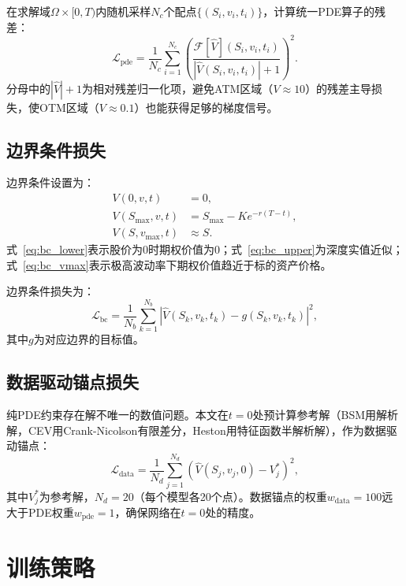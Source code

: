 在求解域$\Omega\times[0,T)$内随机采样$N_c$个配点$\{(S_i,v_i,t_i)\}$，计算统一PDE算子的残差：
\begin{equation}
  \mathcal{L}_\text{pde} = \frac{1}{N_c}\sum_{i=1}^{N_c}
    \left(\frac{\mathcal{F}[\hat{V}](S_i,v_i,t_i)}{|\hat{V}(S_i,v_i,t_i)|+1}\right)^2.
\end{equation}
分母中的$|\hat{V}|+1$为相对残差归一化项，避免ATM区域（$V\approx 10$）的残差主导损失，使OTM区域（$V\approx 0.1$）也能获得足够的梯度信号。

\subsection{边界条件损失}

边界条件设置为：
\begin{align}
  V(0,v,t) &= 0, \label{eq:bc_lower} \\
  V(S_\text{max},v,t) &= S_\text{max} - Ke^{-r(T-t)}, \label{eq:bc_upper} \\
  V(S,v_\text{max},t) &\approx S. \label{eq:bc_vmax}
\end{align}
式~\eqref{eq:bc_lower}表示股价为0时期权价值为0；式~\eqref{eq:bc_upper}为深度实值近似；式~\eqref{eq:bc_vmax}表示极高波动率下期权价值趋近于标的资产价格。

边界条件损失为：
\begin{equation}
  \mathcal{L}_\text{bc} = \frac{1}{N_b}\sum_{k=1}^{N_b}
    \left|\hat{V}(S_k,v_k,t_k) - g(S_k,v_k,t_k)\right|^2,
\end{equation}
其中$g$为对应边界的目标值。

\subsection{数据驱动锚点损失}

纯PDE约束存在解不唯一的数值问题。本文在$t=0$处预计算参考解（BSM用解析解，CEV用Crank-Nicolson有限差分，Heston用特征函数半解析解），作为数据驱动锚点：
\begin{equation}
  \mathcal{L}_\text{data} = \frac{1}{N_d}\sum_{j=1}^{N_d}
    \left(\hat{V}(S_j,v_j,0) - V_j^*\right)^2,
\end{equation}
其中$V_j^*$为参考解，$N_d=20$（每个模型各20个点）。数据锚点的权重$w_\text{data}=100$远大于PDE权重$w_\text{pde}=1$，确保网络在$t=0$处的精度。

\section{训练策略}\label{sec:training}

